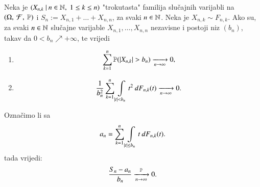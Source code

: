 \begin{tm}  \label{tm:12.15}
    Neka je $({X_{n, k}} \: | \: {n \in \mathbb{N}, \; 1 \leq k \leq n})$ "trokutasta" familija slu\v cajnih varijabli na $(\Omega, \: \mathcal{F}, \: \mathbb{P})$ i $S_n := X_{n, 1} + \ldots + X_{n, n}$, za svaki $n \in \mathbb{N}$.
    Neka je $X_{n, k} \sim F_{n, k}$.
    Ako su, za svaki $n \in \mathbb{N}$ slu\v cajne varijable $X_{n, 1}, \ldots, X_{n, n}$ nezavisne i postoji niz $(b_n)$, takav da $0 < b_n \nearrow +\infty$, te vrijedi
    \begin{enumerate}[label=(\roman*)]
        \item \label{tm:12.15.1}
        \begin{equation*}
            \sum\limits_{k = 1}^{n} \mathbb{P}({|X_{n, k}| > b_n}) \xrightarrow[n \to \infty]{} 0,
        \end{equation*}
        \item \label{tm:12.15.2}
        \begin{equation*}
            \frac{1}{b_n^2} \sum\limits_{k = 1}^{n} \int\limits_{|t| < b_n} t^2 \: dF_{n, k}(t) \xrightarrow[n \to \infty]{} 0.
        \end{equation*}
    \end{enumerate}
    Ozna\v cimo li sa
    \begin{equation*}
        a_n = \sum\limits_{k = 1}^{n} \int\limits_{|t| \leq b_n} t \: dF_{n, k} (t).
    \end{equation*}
    tada vrijedi:
    \begin{equation*}
        \frac{S_n - a_n}{b_n} \xrightarrow[n \to \infty]{\mathbb{P}} 0.
    \end{equation*}    
\end{tm}

